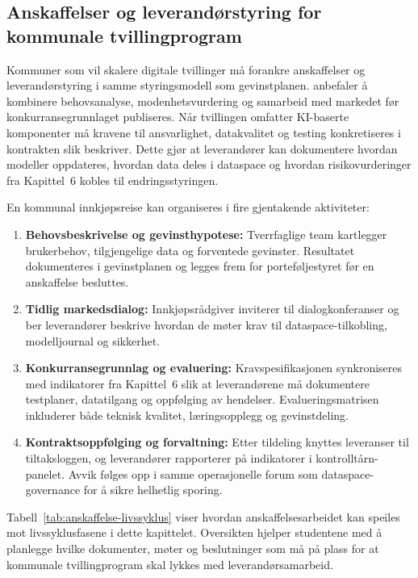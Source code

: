 \subsection*{Anskaffelser og leverandørstyring for kommunale tvillingprogram}
Kommuner som vil skalere digitale tvillinger må forankre anskaffelser og leverandørstyring i samme styringsmodell som gevinstplanen. \citet{dfo2023anskaffelser} anbefaler å kombinere behovsanalyse, modenhetsvurdering og samarbeid med markedet før konkurransegrunnlaget publiseres. Når tvillingen omfatter KI-baserte komponenter må kravene til ansvarlighet, datakvalitet og testing konkretiseres i kontrakten slik \citet{dfo2024anskaffelseki} beskriver. Dette gjør at leverandører kan dokumentere hvordan modeller oppdateres, hvordan data deles i dataspace og hvordan risikovurderinger fra Kapittel~6 kobles til endringsstyringen.

En kommunal innkjøpsreise kan organiseres i fire gjentakende aktiviteter:
\begin{enumerate}
    \item \textbf{Behovsbeskrivelse og gevinsthypotese:} Tverrfaglige team kartlegger brukerbehov, tilgjengelige data og forventede gevinster. Resultatet dokumenteres i gevinstplanen og legges frem for porteføljestyret før en anskaffelse besluttes.\citep{dfo2023anskaffelser}
    \item \textbf{Tidlig markedsdialog:} Innkjøpsrådgiver inviterer til dialogkonferanser og ber leverandører beskrive hvordan de møter krav til dataspace-tilkobling, modelljournal og sikkerhet.\citep{digdir2023modelljournal,ks2023leverandor}
    \item \textbf{Konkurransegrunnlag og evaluering:} Kravspesifikasjonen synkroniseres med indikatorer fra Kapittel~6 slik at leverandørene må dokumentere testplaner, datatilgang og oppfølging av hendelser. Evalueringsmatrisen inkluderer både teknisk kvalitet, læringsopplegg og gevinstdeling.\citep{dfo2024anskaffelseki}
    \item \textbf{Kontraktsoppfølging og forvaltning:} Etter tildeling knyttes leveranser til tiltaksloggen, og leverandører rapporterer på indikatorer i kontrolltårn-panelet. Avvik følges opp i samme operasjonelle forum som dataspace-governance for å sikre helhetlig sporing.\citep{ks2023leverandor}
\end{enumerate}

Tabell~\ref{tab:anskaffelse-livssyklus} viser hvordan anskaffelsesarbeidet kan speiles mot livssyklusfasene i dette kapittelet. Oversikten hjelper studentene med å planlegge hvilke dokumenter, møter og beslutninger som må på plass for at kommunale tvillingprogram skal lykkes med leverandørsamarbeid.

